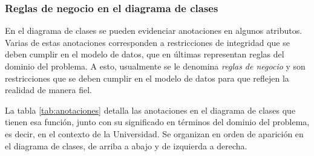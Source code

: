 \subsubsection{Reglas de negocio en el diagrama de clases}

En el diagrama de clases se pueden evidenciar anotaciones en algunos atributos. Varias de estas anotaciones corresponden a restricciones de integridad que se deben cumplir en el modelo de datos, que en últimas representan reglas del dominio del problema. A esto, usualmente se le denomina \textit{reglas de negocio} y son restricciones que se deben cumplir en el modelo de datos para que reflejen la realidad de manera fiel.

La tabla \ref{tab:anotaciones} detalla las anotaciones en el diagrama de clases que tienen esa función, junto con su significado en términos del dominio del problema, es decir, en el contexto de la Universidad. Se organizan en orden de aparición en el diagrama de clases, de arriba a abajo y de izquierda a derecha.

